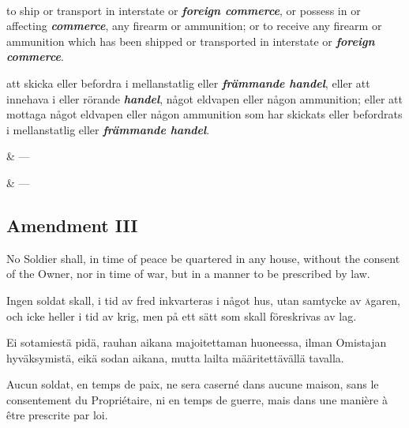 \documentclass[a4paper,landscape,12pt]{article}
\begin{document}
~

\begin{minipage}[t]{0.22\textwidth}
to ship or transport in interstate or \textbf{\textit{foreign commerce}}, or possess in or affecting \textbf{\textit{commerce}}, any firearm or ammunition; or to receive any firearm or ammunition which has been shipped or transported in interstate or \textbf{\textit{foreign commerce}}.
\end{minipage}\textwidth
\begin{minipage}[t]{0.22\textwidth}
att skicka eller befordra i mellanstatlig eller \textbf{\textit{främmande handel}}, eller att innehava i eller rörande \textbf{\textit{handel}}, något eldvapen eller någon ammunition; eller att mottaga något eldvapen eller någon ammunition som har skickats eller befordrats i mellanstatlig eller \textbf{\textit{främmande handel}}.
\end{minipage}\textwidth
\begin{minipage}[t]{0.22\textwidth}
\& ---
\end{minipage}\textwidth
\begin{minipage}[t]{0.22\textwidth}
\& ---
\end{minipage}

\subsection*{Amendment III}
\begin{minipage}[t]{0.22\textwidth}
No Soldier shall, in time of peace be quartered in any house, without the consent of the Owner, nor in time of war, but in a manner to be prescribed by law.
\end{minipage}\textwidth
\begin{minipage}[t]{0.22\textwidth}
Ingen soldat skall, i tid av fred inkvarteras i något hus, utan samtycke av \textsc{ä}garen, och icke heller i tid av krig, men på ett sätt som skall föreskrivas av lag.
\end{minipage}\textwidth
\begin{minipage}[t]{0.22\textwidth}
Ei sotamiestä pidä, rauhan aikana majoitettaman huoneessa, ilman Omistajan hyväksymistä, eikä sodan aikana, mutta lailta määritettävällä tavalla.
\end{minipage}\textwidth
\begin{minipage}[t]{0.22\textwidth}
Aucun soldat, en temps de paix, ne sera caserné dans aucune maison, sans le consentement du Propriétaire, ni en temps de guerre, mais dans une manière à être prescrite par loi.
\end{minipage}
\end{document}
